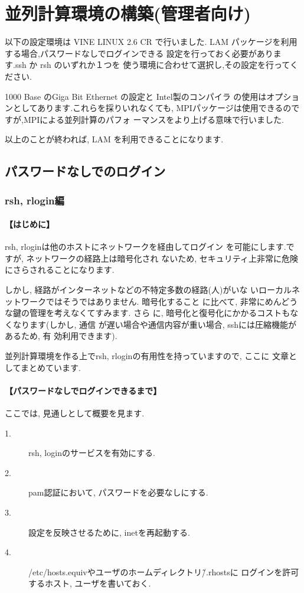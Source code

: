 \documentclass[a4paper,titlepage]{jreport}
\begin{document}
\chapter{並列計算環境の構築(管理者向け)\label{app:kanri}}
以下の設定環境は VINE LINUX 2.6 CR で行いました.
LAM パッケージを利用する場合,パスワードなしでログインできる
設定を行っておく必要があります.ssh か rsh のいずれか１つを
使う環境に合わせて選択し,その設定を行ってください.

1000 Base のGiga Bit Ethernet の設定と Intel製のコンパイラ
の使用はオプションとしてあります.これらを採りいれなくても,
MPIパッケージは使用できるのですが,MPIによる並列計算のパフォ
ーマンスをより上げる意味で行いました.

以上のことが終われば, LAM を利用できることになります.

\section{パスワードなしでのログイン}

\subsection{rsh, rlogin編}

\subsubsection{【はじめに】}
rsh, rloginは他のホストにネットワークを経由してログイン
を可能にします.ですが, ネットワークの経路上は暗号化され
ないため, セキュリティ上非常に危険にさらされることになります.

しかし, 経路がインターネットなどの不特定多数の経路(人)がいな
いローカルネットワークではそうではありません. 暗号化すること
に比べて, 非常にめんどうな鍵の管理を考えなくてすみます. さら
に, 暗号化と復号化にかかるコストもなくなります(しかし, 通信
が遅い場合や通信内容が重い場合, sshには圧縮機能があるため, 有
効利用できます).

並列計算環境を作る上でrsh, rloginの有用性を持っていますので, ここに
文章としてまとめています.

\subsubsection{【パスワードなしでログインできるまで】}

ここでは, 見通しとして概要を見ます.

\begin{description}
\item[1.] rsh, loginのサービスを有効にする.
\item[2.] pam認証において, パスワードを必要なしにする.
\item[3.] 設定を反映させるために, inetを再起動する.
\item[4.] /etc/hosts.equivやユーザのホームディレクトリ\~/.rhostsに
          ログインを許可するホスト, ユーザを書いておく.
\end{description}
\end{document}
